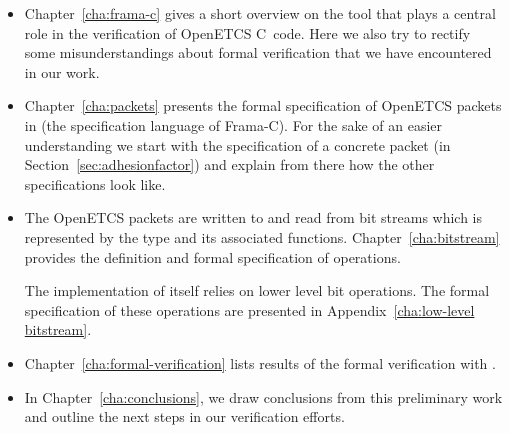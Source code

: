 \begin{itemize}
\item
Chapter~\ref{cha:frama-c} gives a short overview on the \framacwp tool
that plays a central role in the verification of OpenETCS C~code.
Here we also try to rectify some misunderstandings about formal verification
that we have encountered in our work.

\item
Chapter~\ref{cha:packets} presents the formal specification of OpenETCS
packets in \acsl (the specification language of Frama-C).
For the sake of an easier understanding we start with the specification of
a concrete packet (\adhesion in Section~\ref{sec:adhesionfactor})
and explain from there how the other specifications look like.

\item
The OpenETCS packets are written to and read from bit streams which is represented
by the type  and its associated functions.
Chapter~\ref{cha:bitstream} provides the definition and formal specification
of  operations.

The implementation of  itself relies on lower level bit operations.
The formal specification of these operations are presented in Appendix~\ref{cha:low-level bitstream}.

\item 
Chapter~\ref{cha:formal-verification} lists results of the formal verification with \framacwp.

\item
In Chapter~\ref{cha:conclusions}, we draw conclusions from this preliminary work
and outline the next steps in our verification efforts.
\end{itemize}

